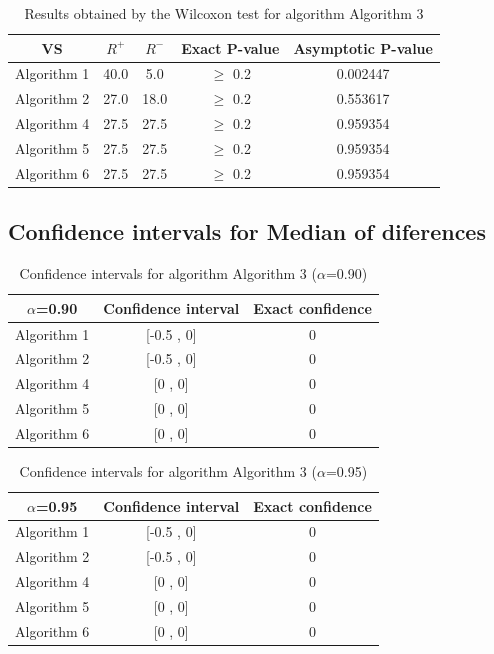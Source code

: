 \documentclass[a4paper,10pt]{article}
\begin{document}
\begin{table}[!htp]
\centering\small
\begin{tabular}{
|c|c|c|c|c|}
\hline
 VS & $R^{+}$ & $R^{-}$ & Exact P-value & Asymptotic P-value \\ \hline 
Algorithm 1 & 40.0 & 5.0 & $\geq$ 0.2 & 0.002447\\ \hline 
Algorithm 2 & 27.0 & 18.0 & $\geq$ 0.2 & 0.553617\\ \hline 
Algorithm 4 & 27.5 & 27.5 & $\geq$ 0.2 & 0.959354\\ \hline 
Algorithm 5 & 27.5 & 27.5 & $\geq$ 0.2 & 0.959354\\ \hline 
Algorithm 6 & 27.5 & 27.5 & $\geq$ 0.2 & 0.959354\\ \hline 

\end{tabular}
\caption{Results obtained by the Wilcoxon test for algorithm Algorithm 3}
\end{table}

\subsection{Confidence intervals for Median of diferences}

\begin{table}[!htp]
\centering\small
\begin{tabular}{
|c|c|c|}
\hline
 $\alpha$=0.90 & Confidence interval & Exact confidence \\ \hline 
Algorithm 1 & [-0.5 , 0] & 0\\ \hline 
Algorithm 2 & [-0.5 , 0] & 0\\ \hline 
Algorithm 4 & [0 , 0] & 0\\ \hline 
Algorithm 5 & [0 , 0] & 0\\ \hline 
Algorithm 6 & [0 , 0] & 0\\ \hline 

\end{tabular}
\caption{Confidence intervals for algorithm Algorithm 3 ($\alpha$=0.90)}
\end{table}
\begin{table}[!htp]
\centering\small
\begin{tabular}{
|c|c|c|}
\hline
 $\alpha$=0.95 & Confidence interval & Exact confidence \\ \hline 
Algorithm 1 & [-0.5 , 0] & 0\\ \hline 
Algorithm 2 & [-0.5 , 0] & 0\\ \hline 
Algorithm 4 & [0 , 0] & 0\\ \hline 
Algorithm 5 & [0 , 0] & 0\\ \hline 
Algorithm 6 & [0 , 0] & 0\\ \hline 

\end{tabular}
\caption{Confidence intervals for algorithm Algorithm 3 ($\alpha$=0.95)}
\end{table}
\end{document}
